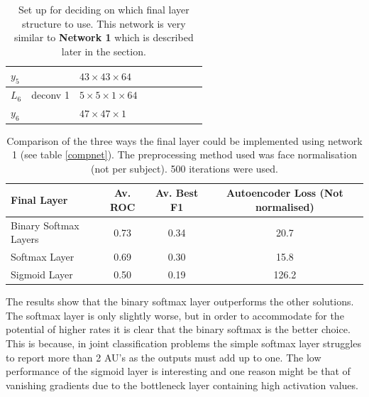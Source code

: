 \begin{table}[h!]
{\begin{tabular}{|lllllllll|}
    \multicolumn{1}{|l|}{$y_5$}   &          & \multicolumn{1}{l|}{$43\times43\times 64$}          &          & \multicolumn{1}{l|}{}          \\ \hline
    \multicolumn{1}{|l|}{$L_6$}   & deconv 1   & \multicolumn{1}{l|}{$5\times 5\times1\times 64$}  &          & \multicolumn{1}{l|}{}\\
    \multicolumn{1}{|l|}{$y_6$}   &          & \multicolumn{1}{l|}{$47\times47\times1$}            &          & \multicolumn{1}{l|}{}         \\ \hline
    \end{tabular}

    \caption{Set up for deciding on which final layer structure to use.
    This network is very similar to \textbf{Network 1} which is described later in the section.} \label{net:classcompnet}

    }
    \end{table}


    \begin{table}[!h] {\footnotesize
      \centering
      \begin{tabular}{lccc}
      \hline
      Final Layer   & Av. ROC &   Av. Best F1 &   Autoencoder Loss (Not normalised) \\
      \hline
      Binary Softmax Layers  &   0.73 &  0.34 &   20.7 \\
      Softmax Layer          &   0.69 &  0.30 &   15.8 \\
      Sigmoid Layer          &   0.50 &  0.19 &  126.2 \\
      \hline
      \end{tabular}
    \caption{Comparison of the three ways the final layer could be implemented using network 1 (see table \ref{compnet}). The
    preprocessing method used was face normalisation (not per subject). 500 iterations were used. } \label{tab:binsoftcomp} }
    \end{table}

    The results show that the binary softmax layer outperforms the other solutions. The
    softmax layer is only slightly worse, but in order to accommodate for the potential of higher rates
    it is clear that the binary softmax is the better choice. This is because, in joint classification problems
    the simple softmax layer struggles to report more than 2 AU's as the outputs must add up to one.
    The low performance of the sigmoid layer is interesting and one reason might be that of vanishing gradients due to
    the bottleneck layer containing high activation values.

